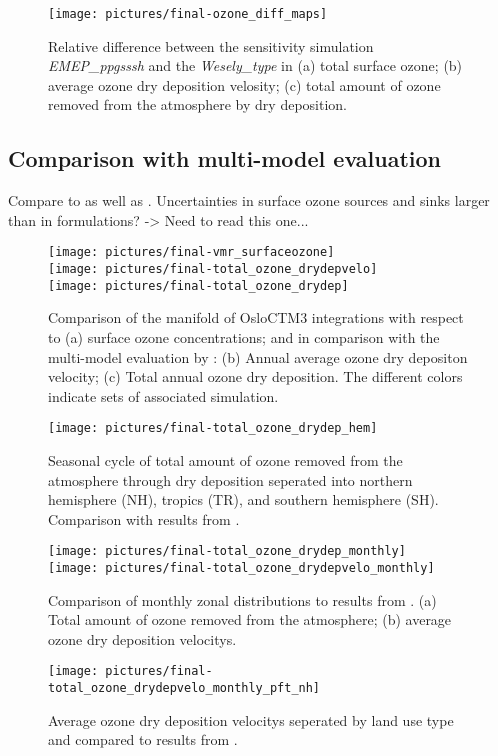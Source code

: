 \documentclass[gmd, manuscript]{copernicus}
\begin{document}
%
\begin{figure}[t]
  \texttt{[image: pictures/final-ozone\_diff\_maps]}
  \caption{Relative difference between the sensitivity simulation \emph{EMEP\_ppgsssh} and the \emph{Wesely\_type} in (a) total surface ozone; (b) average ozone dry deposition velosity; (c) total amount of ozone removed from the atmosphere by dry deposition.}
  \label{fig:diff_maps}
\end{figure}
%
\subsection{Comparison with multi-model evaluation}
\label{subsec:model}
Compare to \citet{ACP:Hardacre2015} as well as \citet{ACP:Luhar2017}. \citep{AE:Derwent2018} Uncertainties in surface ozone sources and sinks larger than in formulations? -> Need to read this one...



\begin{figure}[t]
  \texttt{[image: pictures/final-vmr\_surfaceozone]}\\
  \texttt{[image: pictures/final-total\_ozone\_drydepvelo]}\\
  \texttt{[image: pictures/final-total\_ozone\_drydep]}
  \caption{Comparison of the manifold of OsloCTM3 integrations with respect to (a) surface ozone concentrations; and in comparison with the multi-model evaluation by \citet{ACP:Hardacre2015}: (b) Annual average ozone dry depositon velocity; (c) Total annual ozone dry deposition. The different colors indicate sets of associated simulation.}
  \label{fig:mmm_drydep}
\end{figure}
%
\begin{figure*}[t]
  \texttt{[image: pictures/final-total\_ozone\_drydep\_hem]}
  \caption{Seasonal cycle of total amount of ozone removed from the atmosphere through dry deposition seperated into northern hemisphere (NH), tropics (TR), and southern hemisphere (SH). Comparison with results from \citet{ACP:Hardacre2015}.}
  \label{fig:mmm_drydep_hem}
\end{figure*}
%
\begin{figure}[t]
  \texttt{[image: pictures/final-total\_ozone\_drydep\_monthly]}\\
  \texttt{[image: pictures/final-total\_ozone\_drydepvelo\_monthly]}
  \caption{Comparison of monthly zonal distributions to results from \citep{ACP:Hardacre2015}. (a) Total amount of ozone removed from the atmosphere; (b) average ozone dry deposition velocitys.}
  \label{fig:mmm_drydep_season}
\end{figure}
%
\begin{figure}[t]
  \texttt{[image: pictures/final-total\_ozone\_drydepvelo\_monthly\_pft\_nh]}
  \caption{Average ozone dry deposition velocitys seperated by land use type and compared to results from \citep{ACP:Hardacre2015}.}
  \label{fig:mmm_drydep_season_pft}
\end{figure}
\end{document}
